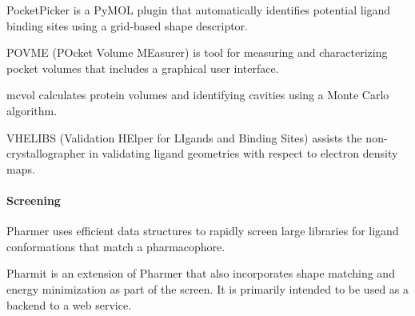 PocketPicker \cite{Weisel_2007}  is a PyMOL plugin that automatically identifies potential ligand binding sites using a grid-based shape descriptor.

POVME (POcket Volume MEasurer) \cite{Durrant_2014} is tool for measuring and characterizing pocket volumes that includes a graphical user interface.

mcvol \cite{Till_2009} calculates protein volumes and identifying cavities using a Monte Carlo algorithm.

VHELIBS (Validation HElper for LIgands and Binding Sites) \cite{Cereto_Massagu__2013} assists the non-crystallographer in validating ligand geometries with respect to electron density maps.


\paragraph{Screening}

Pharmer \cite{Koes_2011} uses efficient data structures to rapidly screen large libraries for ligand conformations that match a pharmacophore.

Pharmit \cite{Sunseri_2016} is an extension of Pharmer that also incorporates shape matching and energy minimization as part of the screen.  It is primarily intended to be used as a backend to a web service.